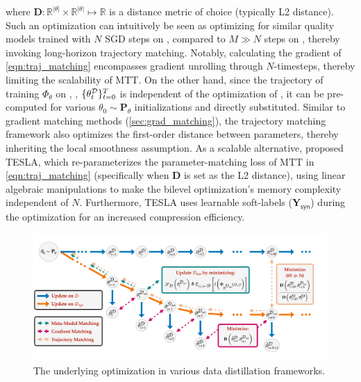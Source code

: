 \documentclass[10pt]{article} %
\begin{document}
where $\mathbf{D} : \mathbb{R}^{|\theta|} \times \mathbb{R}^{|\theta|} \mapsto \mathbb{R}$ is a distance metric of choice (typically L2 distance). Such an optimization can intuitively be seen as optimizing for similar quality models trained with $N$ SGD steps on \distill, compared to $M \gg N$ steps on \dataset, thereby invoking long-horizon trajectory matching. Notably, calculating the gradient of \cref{eqn:traj_matching} \wrt \distill encompasses gradient unrolling through $N$-timesteps, thereby limiting the scalability of MTT. On the other hand, since the trajectory of training $\Phi_\theta$ on \dataset, \ie, $\{ \theta_t^\mathcal{D} \}_{t=0}^T$ is independent of the optimization of \distill, it can be pre-computed for various $\theta_0 \sim \mathbf{P}_\theta$ initializations and directly substituted. Similar to gradient matching methods (\cref{sec:grad_matching}), the trajectory matching framework also optimizes the first-order distance between parameters, thereby inheriting the local smoothness assumption. As a scalable alternative, \citet{tesla} proposed TESLA, which re-parameterizes the parameter-matching loss of MTT in \cref{eqn:traj_matching} (specifically when $\mathbf{D}$ is set as the L2 distance), using linear algebraic manipulations to make the bilevel optimization's memory complexity independent of $N$. Furthermore, TESLA uses learnable soft-labels ($\mathbf{Y}_{\mathsf{syn}}$) during the optimization for an increased compression efficiency.

\begin{figure}[t!] \centering
    \centering
    \includegraphics[width=\linewidth]{figures/optimization.pdf}
    \renewcommand\figurename{\href{https://www.noveens.com/images/dd_survey/optimization.pdf}{[HQ Image Link]} Figure}
    \vspace{-10pt}
    \caption{The underlying optimization in various data distillation frameworks.}
    \label{fig:pictorial_gradients}
\end{figure} 
\end{document}
